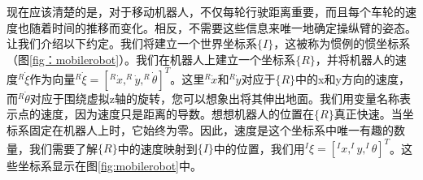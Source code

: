 
现在应该清楚的是，对于移动机器人，不仅每轮行驶距离重要，而且每个车轮的速度也随着时间的推移而变化。相反，不需要这些信息来唯一地确定操纵臂的姿态。让我们介绍以下约定。我们将建立一个世界坐标系$ \{I \} $，这被称为惯例的惯坐标系（图\ref {fig：mobilerobot}）。我们在机器人上建立一个坐标系$ \{R \} $，并将机器人的速度$ ^ R \dot{\xi} $作为向量$ ^R\dot{\xi} = [^R\dot{x},^R\dot{y},^R\dot{\theta}]^T $。这里$ ^R \dot {x} $和$ ^R \dot{y} $对应于$ \{R \} $中的x和y方向的速度，而$ ^R\dot{\theta} $对应于围绕虚拟z轴的旋转，您可以想象出将其伸出地面。我们用变量名称表示点的速度，因为速度只是距离的导数。想想机器人的位置在$ \{R \} $真正快速。当坐标系固定在机器人上时，它始终为零。因此，速度是这个坐标系中唯一有趣的数量，我们需要了解$ \{R \} $中的速度映射到$ \{I \} $中的位置，我们用$ ^ I\xi = [^Ix,^Iy,^I\theta]^T $。这些坐标系显示在图\ref{fig:mobilerobot}中。

